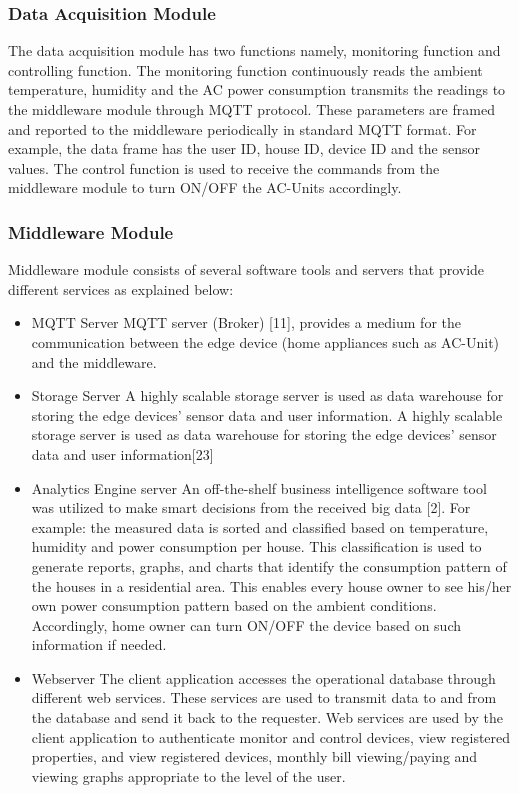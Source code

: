 \documentclass[a4paper,12pt,oneside]{article}
\begin{document}
\subsubsection{Data Acquisition Module}
The data acquisition module has two functions namely,
monitoring function and controlling function. The monitoring
function continuously reads the ambient temperature, humidity
and the AC power consumption transmits the readings to the
middleware module through MQTT protocol. These
parameters are framed and reported to the middleware
periodically in standard MQTT format. For example, the data
frame has the user ID, house ID, device ID and the sensor values. The control function is used to receive the commands
from the middleware module to turn ON/OFF the AC-Units
accordingly.
\subsubsection{Middleware Module}
Middleware module consists of several software tools and
servers that provide different services as explained below:
\begin{itemize}
    \item MQTT Server
    \newline
    MQTT server (Broker) [11], provides a medium for the
    communication between the edge device (home
    appliances such as AC-Unit) and the middleware.
    \item Storage Server\newline
    A highly scalable storage server is used as data
    warehouse for storing the edge devices’ sensor data and
    user information. A highly scalable storage server is used as data
    warehouse for storing the edge devices’ sensor data and
    user information[23]
    \item Analytics Engine server \newline
    An off-the-shelf business intelligence software tool was
    utilized to make smart decisions from the received big
    data [2]. For example: the measured data is sorted and
    classified based on temperature, humidity and power
    consumption per house. This classification is used to
    generate reports, graphs, and charts that identify the
    consumption pattern of the houses in a residential area.
    This enables every house owner to see his/her own power
    consumption pattern based on the ambient conditions.
    Accordingly, home owner can turn ON/OFF the device
    based on such information if needed.
    \item Webserver \newline
      The client application accesses the operational database
    through different web services. These services are used to transmit data
    to and from the database and send it back to the
    requester. Web services are used by the client application
    to authenticate monitor and control devices, view
    registered properties, and view registered devices,
    monthly bill viewing/paying and viewing graphs
    appropriate to the level of the user.
    
\end{itemize}
\end{document}
